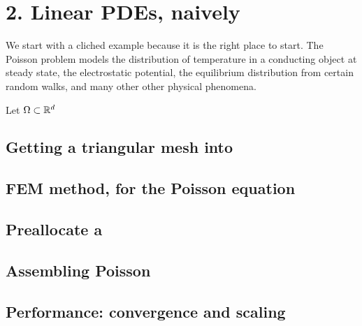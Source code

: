 
\chapter{2. Linear PDEs, naively}

We start with a cliched example because it is the right place to start.  The Poisson problem models the distribution of temperature in a conducting object at steady state, the electrostatic potential, the equilibrium distribution from certain random walks, and many other other physical phenomena.

Let $\Omega \subset \mathbb{R}^d$

\section{Getting a triangular mesh into \PETSc}


\section{FEM method, for the Poisson equation}

\section{Preallocate a \pMat}


\section{Assembling Poisson}

\section{Performance: convergence and scaling}

